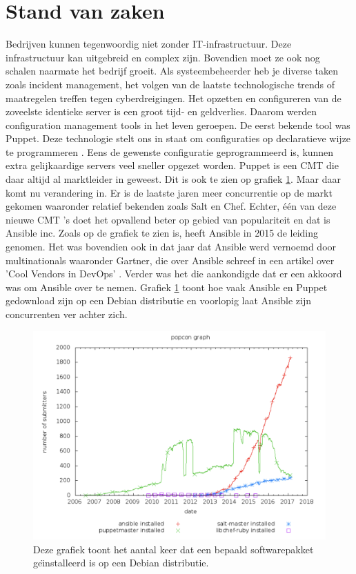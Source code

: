 \section{Stand van zaken}
\label{sec:stand-van-zaken}
Bedrijven kunnen tegenwoordig niet zonder IT-infrastructuur. Deze infrastructuur kan uitgebreid en complex zijn. Bovendien moet ze ook nog schalen naarmate het bedrijf groeit. Als systeembeheerder heb je diverse taken zoals incident management, 
het volgen van de laatste technologische trends of maatregelen treffen tegen cyberdreigingen. Het opzetten en configureren van de zoveelste identieke server is een groot tijd- en geldverlies. Daarom werden configuration management tools in het leven geroepen. De eerst bekende tool was Puppet. Deze technologie stelt ons in staat om configuraties op declaratieve wijze te programmeren \autocite{PuppetDeclaratief}. Eens de gewenste configuratie geprogrammeerd is, kunnen extra gelijkaardige servers veel sneller opgezet worden. 
Puppet is een \gls{CMT} die daar altijd al marktleider in geweest. Dit is ook te zien op grafiek \ref{fig:popcon_everybody}. Maar daar komt nu verandering in. Er is de laatste jaren meer concurrentie op de markt gekomen waaronder relatief bekenden zoals Salt en Chef. 
Echter, \'e\'en van deze nieuwe \gls{CMT} 's doet het opvallend beter op gebied van populariteit en dat is Ansible inc. Zoals op de grafiek te zien is, heeft Ansible in 2015 de leiding genomen. Het was bovendien ook in dat jaar dat Ansible werd vernoemd door multinationals waaronder Gartner, die over Ansible schreef in een artikel over 'Cool Vendors in DevOps' \autocite{gartner}. Verder was het \textcite{redhatovername} die aankondigde dat er een akkoord was om Ansible over te nemen. Grafiek \ref{fig:popcon_everybody} toont hoe vaak Ansible en Puppet gedownload zijn op een Debian distributie en voorlopig laat Ansible zijn concurrenten ver achter zich. 


\begin{figure}
  \includegraphics[width=\linewidth]{img/popcon_everybody.png}
  \caption{Deze grafiek toont het aantal keer dat een bepaald softwarepakket ge\"{\i}nstalleerd is op een Debian distributie. \autocite{popcon}}
  \label{fig:popcon_everybody}
\end{figure}

